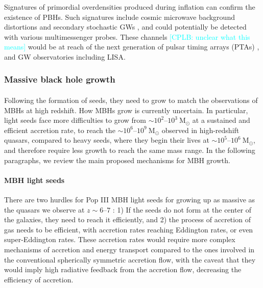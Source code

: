 \documentclass[a4paper,12pt]{article}
\newcommand{\cplb}[1]{\textcolor{cyan}{[CPLB: #1]}}
\begin{document}
Signatures of primordial overdensities produced during inflation can confirm the existence of PBHs. Such signatures include cosmic microwave background distortions \cite{chluba2012probing,cappelluti2022exploring} and secondary stochastic GWs \cite{keisuke2017inflationary,de2020nanograv}, and could potentially be detected with various multimessenger probes. These channels \cplb{unclear what this means} would be at reach of the next generation of pulsar timing arrays (PTAs) \cite{byrnes2019steepest,inomata2019gravitational}, and GW observatories including LISA\cite{auclair2023cosmology}. 

\subsubsection{Massive black hole growth}

\paragraph{}
Following the formation of seeds, they need to grow to match the observations of MBHs at high redshift. How MBHs grow is currently uncertain. In particular, light seeds face more difficulties to grow from $\sim10^{2}$--$10^{3}~\mathrm{M}_{\odot}$ at a sustained and efficient accretion rate, to reach the $\sim10^{6}$--$10^{9}~\mathrm{M}_{\odot}$ observed in high-redshift quasars, compared to heavy seeds, where they begin their lives at $\sim10^{5}$--$10^{6}~\mathrm{M}_{\odot}$, and therefore require less growth to reach the same mass range. In the following paragraphs, we review the main proposed mechanisms for MBH growth. 

\paragraph{MBH light seeds} 
There are two hurdles for Pop III MBH light seeds for growing up as massive as the quasars we observe at $z\sim6$--$7$ \cite{amaro2023astrophysics}: 1) If the seeds do not form at the center of the galaxies, they need to reach it efficiently, and 2) the process of accretion of gas needs to be efficient, with accretion rates reaching Eddington rates, or even super-Eddington rates. These accretion rates would require more complex mechanisms of accretion and energy transport compared to the ones involved in the conventional spherically symmetric accretion flow, with the caveat that they would imply high radiative feedback from the accretion flow, decreasing the efficiency of accretion.
\end{document}
